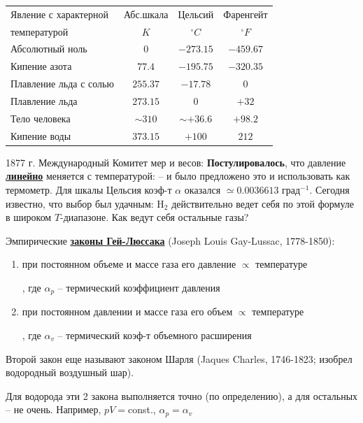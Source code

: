 \begin{center}
\begin{tabular}{|l||c|c|c|}\hline
Явление с характерной  & Абс.шкала &  Цельсий     & Фаренгейт  \\
 температурой          &   $K$     & $^\circ C$   & $^\circ F$ \\ \hline\hline
Абсолютный ноль        & $  0   $    & $-273.15 $   & $-459.67$    \\ \hline
Кипение азота          & $ 77.4 $    & $-195.75 $   & $-320.35$    \\ \hline
Плавление льда с солью & $255.37$    & $ -17.78 $   & $   0   $    \\ \hline
Плавление льда         & $273.15$    & $   0    $   & $ +32   $    \\ \hline
Тело человека          & $\sim310$   & $\sim+36.6$   & $ +98.2 $    \\ \hline
Кипение воды           & $373.15$    & $+100    $   & $  212  $    \\ \hline
\end{tabular}
\end{center}

1877 г. Международный Комитет мер и весов: {\bf Постулировалось}, что давление \underline{\bf линейно} меняется с температурой:
 -- и было предложено это и использовать как термометр. Для шкалы Цельсия коэф-т $\alpha$ оказался $\simeq0.0036613$ град$^{-1}$. Сегодня известно, что выбор был удачным: H$_2$ действительно ведет себя по этой формуле в широком $T$-диапазоне.  Как ведут себя остальные газы?

Эмпирические \underline{\bf законы Гей-Люссака} (Joseph Louis Gay-Lussac, 1778-1850):
\begin{enumerate}
\item при постоянном объеме и массе газа его давление $\propto$ температуре

      , где $\alpha_p$ -- термический коэффициент давления
\item при постоянном давлении и массе газа его объем $\propto$ температуре

      , где  $\alpha_v$ -- термический коэф-т объемного расширения
\end{enumerate}
Второй закон еще называют законом Шарля (Jaques Charles, 1746-1823; изобрел водородный воздушный шар).


Для водорода эти 2 закона выполняется точно (по определению), а для остальных -- не очень. Например, $pV=$const., $\alpha_p=\alpha_v$\\

